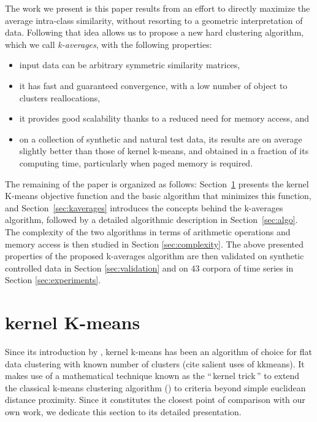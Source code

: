 \documentclass[a4paper,twoside]{article}
\newcommand{\gl}[1]{``\,#1\,''} %
\begin{document}
The work we present is this paper results from an effort to directly maximize the average intra-class similarity, without resorting to a geometric interpretation of data. Following that idea allows us to propose a new hard clustering algorithm, which we call \emph{k-averages}, with the following properties: 
\begin{itemize}
\item input data can be arbitrary symmetric similarity matrices,
\item it has fast and guaranteed convergence, with a low number of object to clusters reallocations,
\item it provides good scalability thanks to a reduced need for memory access, and
\item on a collection of synthetic and natural test data, its results are on average slightly better than those of kernel k-means, and obtained in a fraction of its computing time, particularly when paged memory is required.
\end{itemize}

The remaining of the paper is organized as follows: Section~\ref{sec:kkmeans} presents the kernel K-means objective function and the basic algorithm that minimizes this function, and Section~\ref{sec:kaverages} introduces the concepts behind the k-averages algorithm, 
followed by a detailed algorithmic description in Section~\ref{sec:algo}. 
The complexity of the two algorithms in terms of arithmetic operations and memory access is then studied in Section \ref{sec:complexity}. The above presented properties of the proposed k-averages algorithm are then validated on synthetic controlled data in Section \ref{sec:validation} and on 43 corpora of time series in Section \ref{sec:experiments}.

\section{kernel K-means} \label{sec:kkmeans}

Since its introduction by \cite{Girolami:2002:MKC:2325785.2326903}, kernel k-means has been an algorithm of choice for flat data clustering with known number of clusters (cite salient uses of kkmeans). It makes use of a mathematical technique known as the \gl{kernel trick} to extend the classical k-means clustering algorithm (\cite{macQueenBsmsp67}) to criteria beyond simple euclidean distance proximity. Since it constitutes the closest point of comparison with our own work, we dedicate this section to its detailed presentation.
\end{document}
